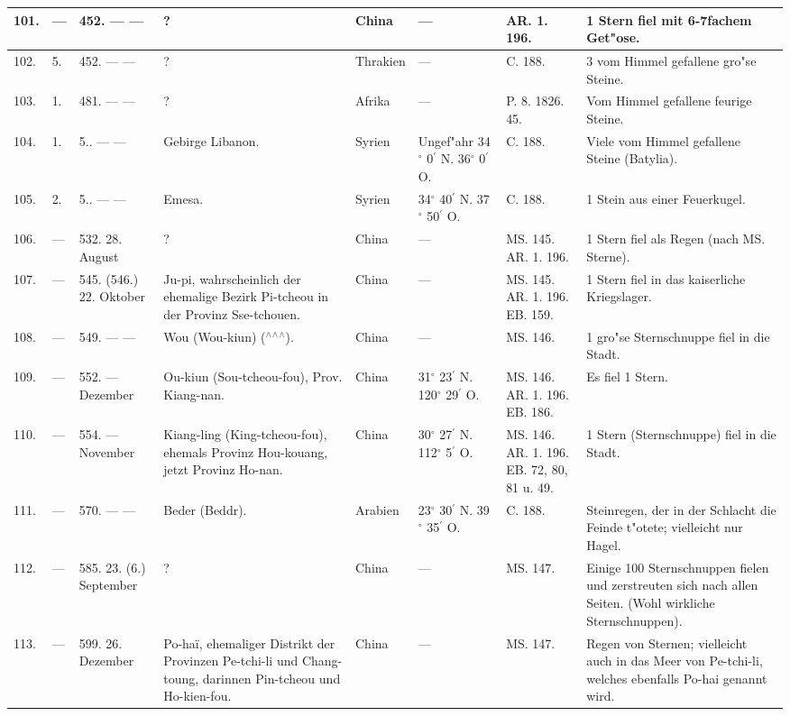 \documentclass[a4paper, 8pt, oneside, polutonikogreek, german]{article}
\begin{document}
\begin{center}
\begin{longtable}{| p{5mm} | p{3mm} | p{15mm} | p{25mm} | p{20mm} | p{14mm} | p{17mm} | p{24mm} |}
        101. & --- & 452. --- --- & ? & China & --- & AR. 1. 196. & 1 Stern fiel mit 6-7fachem Get"ose. \\ \hline
        102. & 5. & 452. --- --- & ? & Thrakien & --- & C. 188. & 3 vom Himmel gefallene gro"se Steine. \\ \hline
        103. & 1. & 481. --- --- & ? & Afrika & --- & P. 8. 1826. 45. & Vom Himmel gefallene feurige Steine. \\ \hline
        104. & 1. & 5.. --- --- & Gebirge Libanon. & Syrien & Ungef"ahr 34$^\circ$ 0$^\prime$ N. 36$^\circ$ 0$^\prime$ O. & C. 188. & Viele vom Himmel gefallene Steine (Batylia). \\ \hline
        105. & 2. & 5.. --- --- & Emesa. & Syrien & 34$^\circ$ 40$^\prime$ N. 37$^\circ$ 50$^\prime$ O. & C. 188. & 1 Stein aus einer Feuerkugel. \\ \hline
        106. & --- & 532. 28. August & ? & China & --- & MS. 145. AR. 1. 196. & 1 Stern fiel als Regen (nach MS. Sterne). \\ \hline
        107. & --- & 545. (546.) 22. Oktober & Ju-pi, wahrscheinlich der ehemalige Bezirk Pi-tcheou in der Provinz Sse-tchouen. & China & --- & MS. 145. AR. 1. 196. EB. 159. & 1 Stern fiel in das kaiserliche Kriegslager. \\ \hline
        108. & --- & 549. --- --- & Wou (Wou-kiun) ($^\wedge$$^\wedge$$^\wedge$). & China & --- & MS. 146. & 1 gro"se Sternschnuppe fiel in die Stadt. \\ \hline
        109. & --- & 552. --- Dezember & Ou-kiun (Sou-tcheou-fou), Prov. Kiang-nan. & China & 31$^\circ$ 23$^\prime$ N. 120$^\circ$ 29$^\prime$ O. & MS. 146. AR. 1. 196. EB. 186. & Es fiel 1 Stern. \\ \hline
        110. & --- & 554. --- November & Kiang-ling (King-tcheou-fou), ehemals Provinz Hou-kouang, jetzt Provinz Ho-nan. & China & 30$^\circ$ 27$^\prime$ N. 112$^\circ$ 5$^\prime$ O. & MS. 146. AR. 1. 196. EB. 72, 80, 81 u. 49. & 1 Stern (Sternschnuppe) fiel in die Stadt. \\ \hline
        111. & --- & 570. --- --- & Beder (Beddr). & Arabien & 23$^\circ$ 30$^\prime$ N. 39$^\circ$ 35$^\prime$ O. & C. 188. & Steinregen, der in der Schlacht die Feinde t"otete; vielleicht nur Hagel. \\ \hline
        112. & --- & 585. 23. (6.) September & ? & China & --- & MS. 147. & Einige 100 Sternschnuppen fielen und zerstreuten sich nach allen Seiten. (Wohl wirkliche Sternschnuppen). \\ \hline
        113. & --- & 599. 26. Dezember & Po-haï, ehemaliger Distrikt der Provinzen Pe-tchi-li und Chang-toung, darinnen Pin-tcheou und Ho-kien-fou. & China & --- & MS. 147. & Regen von Sternen; vielleicht auch in das Meer von Pe-tchi-li, welches ebenfalls Po-hai genannt wird. \\ \hline

\end{longtable}
\end{center}
\end{document}
